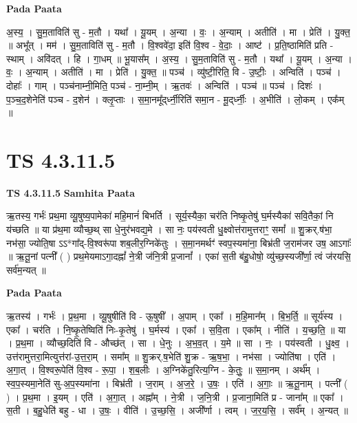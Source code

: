 \documentclass[17pt]{extarticle}
\begin{document}
\textbf{Pada Paata} \newline

अ॒स्य॒ । सु॒म॒ताविति॑ सु - म॒तौ । यथा᳚ । यू॒यम् । अ॒न्या । वः॒ । अ॒न्याम् । अतीति॑ । मा । प्रेति॑ । यु॒क्त॒ ॥ अभू᳚त् । मम॑ । सु॒म॒ताविति॑ सु - म॒तौ । वि॒श्ववे॑दा॒ इति॑ वि॒श्व - वे॒दाः॒ । आष्ट॑ । प्र॒ति॒ष्ठामिति॑ प्रति - स्थाम् । अवि॑दत् । हि । गा॒धम् ॥ भू॒यास᳚म् । अ॒स्य॒ । सु॒म॒ताविति॑ सु - म॒तौ । यथा᳚ । यू॒यम् । अ॒न्या । वः॒ । अ॒न्याम् । अतीति॑ । मा । प्रेति॑ । यु॒क्त॒ ॥ पञ्च॑ । व्यु॑ष्टी॒रिति॒ वि - उ॒ष्टीः॒ । अन्विति॑ । पञ्च॑ । दोहाः᳚ । गाम् । पञ्च॑नाम्नी॒मिति॒ पञ्च॑ - ना॒म्नी॒म् । ऋ॒तवः॑ । अन्विति॑ । पञ्च॑ ॥ पञ्च॑ । दिशः॑ । प॒ञ्च॒द॒शेनेति॑ पञ्च - द॒शेन॑ । क्लृ॒प्ताः । स॒मा॒नमू᳚द्‌र्ध्नी॒रिति॑ समा॒न - मू॒द्‌र्ध्नीः॒ । अ॒भीति॑ । लो॒कम् । एक᳚म् ॥  \newline




\section*{ TS 4.3.11.5 }

\textbf{TS 4.3.11.5 } \newline
\textbf{Samhita Paata} \newline

ऋ॒तस्य॒ गर्भः॑ प्रथ॒मा व्यू॒षुष्य॒पामेका॑ महि॒मानं॑ बिभर्ति । सूर्य॒स्यैका॒ चर॑ति निष्कृ॒तेषु॑ घ॒र्मस्यैका॑ सवि॒तैकां॒ नि य॑च्छति ॥ या प्र॑थ॒मा व्यौच्छ॒थ् सा धे॒नुर॑भवद्य॒मे । सा नः॒ पय॑स्वती धु॒क्ष्वोत्त॑रामुत्तराꣳ॒॒ समां᳚ ॥ शु॒क्रर्.ष॑भा॒ नभ॑सा॒ ज्योति॒षा ऽऽ*गा᳚द्-वि॒श्वरू॑पा शब॒लीर॒ग्निके॑तुः । स॒मा॒नमर्थꣳ॑ स्वप॒स्यमा॑ना॒ बिभ्र॑ती ज॒राम॑जर उष॒ आऽगाः᳚ ॥ ऋ॒तू॒नां पत्नी᳚ ( ) प्रथ॒मेयमाऽगा॒दह्नां᳚ ने॒त्री ज॑नि॒त्री प्र॒जानां᳚ । एका॑ स॒ती ब॑हु॒धोषो॒ व्यु॑च्छ॒स्यजी᳚र्णा॒ त्वं ज॑रयसि॒ सर्व॑म॒न्यत् ॥ \newline

\textbf{Pada Paata} \newline

ऋ॒तस्य॑ । गर्भः॑ । प्र॒थ॒मा । व्यू॒षुषीति॑ वि - ऊ॒षुषी᳚ । अ॒पाम् । एका᳚ । म॒हि॒मान᳚म् । बि॒भ॒र्ति॒ ॥ सूर्य॑स्य । एका᳚ । चर॑ति । नि॒ष्कृ॒तेष्विति॑ निः-कृ॒तेषु॑ । घ॒र्मस्य॑ । एका᳚ । स॒वि॒ता । एका᳚म् । नीति॑ । य॒च्छ॒ति॒ ॥ या । प्र॒थ॒मा । व्यौच्छ॒दिति॑ वि - औच्छ॑त् । सा । धे॒नुः । अ॒भ॒व॒त् । य॒मे ॥ सा । नः॒ । पय॑स्वती । धु॒क्ष्व॒ । उत्त॑रामुत्तरा॒मित्युत्त॑रां-उ॒त्त॒रा॒म् । समा᳚म् ॥ शु॒क्रर्.ष॒भेति॑ शु॒क्र - ऋ॒ष॒भा॒ । नभ॑सा । ज्योति॑षा । एति॑ । अ॒गा॒त् । वि॒श्वरू॒पेति॑ वि॒श्व - रू॒पा॒ । श॒ब॒लीः । अ॒ग्निके॑तु॒रित्य॒ग्नि - के॒तुः॒ ॥ स॒मा॒नम् । अर्थ᳚म् । स्व॒प॒स्यमा॒नेति॑ सु-अ॒प॒स्यमा॑ना । बिभ्र॑ती । ज॒राम् । अ॒ज॒रे॒ । उ॒षः॒ । एति॑ । अ॒गाः॒ ॥ ऋ॒तू॒नाम् । पत्नी᳚ ( ) । प्र॒थ॒मा । इ॒यम् । एति॑ । अ॒गा॒त् । अह्ना᳚म् । ने॒त्री । ज॒नि॒त्री । प्र॒जाना॒मिति॑ प्र - जाना᳚म् ॥ एका᳚ । स॒ती । ब॒हु॒धेति॑ बहु - धा । उ॒षः॒ । वीति॑ । उ॒च्छ॒सि॒ । अजी᳚र्णा । त्वम् । ज॒र॒य॒सि॒ । सर्व᳚म् । अ॒न्यत् ॥  \newline
\end{document}
